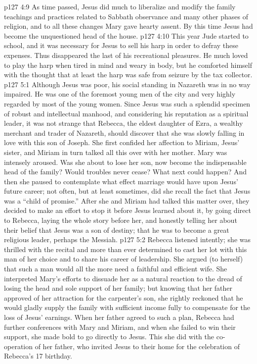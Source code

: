 \vs p127 4:9 \pc As time passed, Jesus did much to liberalize and modify the family teachings and practices related to Sabbath observance and many other phases of religion, and to all these changes Mary gave hearty assent. By this time Jesus had become the unquestioned head of the house.
\vs p127 4:10 This year Jude started to school, and it was necessary for Jesus to sell his harp in order to defray these expenses. Thus disappeared the last of his recreational pleasures. He much loved to play the harp when tired in mind and weary in body, but he comforted himself with the thought that at least the harp was safe from seizure by the tax collector.
\vs p127 5:1 Although Jesus was poor, his social standing in Nazareth was in no way impaired. He was one of the foremost young men of the city and very highly regarded by most of the young women. Since Jesus was such a splendid specimen of robust and intellectual manhood, and considering his reputation as a spiritual leader, it was not strange that Rebecca, the eldest daughter of Ezra, a wealthy merchant and trader of Nazareth, should discover that she was slowly falling in love with this son of Joseph. She first confided her affection to Miriam, Jesus’ sister, and Miriam in turn talked all this over with her mother. Mary was intensely aroused. Was she about to lose her son, now become the indispensable head of the family? Would troubles never cease? What next could happen? And then she paused to contemplate what effect marriage would have upon Jesus’ future career; not often, but at least sometimes, did she recall the fact that Jesus was a “child of promise.” After she and Miriam had talked this matter over, they decided to make an effort to stop it before Jesus learned about it, by going direct to Rebecca, laying the whole story before her, and honestly telling her about their belief that Jesus was a son of destiny; that he was to become a great religious leader, perhaps the Messiah.
\vs p127 5:2 Rebecca listened intently; she was thrilled with the recital and more than ever determined to cast her lot with this man of her choice and to share his career of leadership. She argued (to herself) that such a man would all the more need a faithful and efficient wife. She interpreted Mary’s efforts to dissuade her as a natural reaction to the dread of losing the head and sole support of her family; but knowing that her father approved of her attraction for the carpenter’s son, she rightly reckoned that he would gladly supply the family with sufficient income fully to compensate for the loss of Jesus’ earnings. When her father agreed to such a plan, Rebecca had further conferences with Mary and Miriam, and when she failed to win their support, she made bold to go directly to Jesus. This she did with the co\hyp{}operation of her father, who invited Jesus to their home for the celebration of Rebecca’s 17 birthday.
